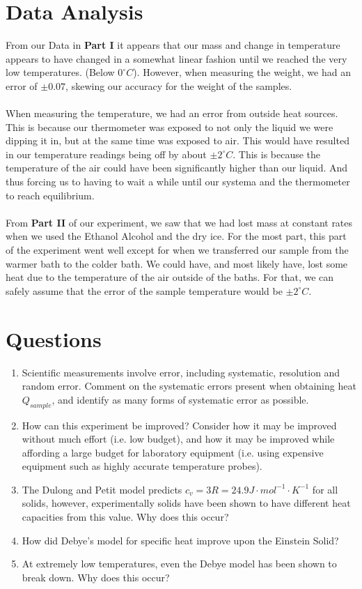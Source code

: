 \documentclass[12pt]{report}
\begin{document}
\section{Data Analysis}
	 From our Data in \textbf{Part I} it appears that our mass and change in temperature appears to have changed in a 
somewhat linear fashion until we reached the very low temperatures. (Below $0^{\circ}C$). However, when measuring the weight, we had an error of $\pm 0.07$, skewing our accuracy for the weight of the samples. \\
	\\When measuring the temperature, we had an error from outside heat sources. This is because our thermometer was exposed to not only the liquid we were dipping it in, but at the same time was exposed to air. This would have resulted in our temperature readings being off by about $\pm 2^{\circ}C$. This is because the temperature of the air could have been significantly higher than our liquid. And thus forcing us to having to wait a while until our systema and the thermometer to reach equilibrium. \\
	\\From \textbf{Part II} of our experiment, we saw that we had lost mass at constant rates when we used the Ethanol Alcohol and the dry ice. For the most part, this part of the experiment went well except for when we transferred our sample from the warmer bath to the colder bath. We could have, and most likely have, lost some heat due to the temperature of the air outside of the baths. For that, we can safely assume that the error of the sample temperature would be $\pm 2^{\circ}C$. \\
\section{Questions}
	\begin{enumerate}
		\item Scientific measurements involve error, including systematic, resolution and
			random error. Comment on the systematic errors present when obtaining
			heat $Q_{sample}$, and identify as many forms of systematic error as possible.
		\item How can this experiment be improved? Consider how it may be improved
			without much effort (i.e. low budget), and how it may be improved while
			affording a large budget for laboratory equipment (i.e. using expensive
			equipment such as highly accurate temperature probes).
		\item The Dulong and Petit model predicts $c_v = 3R = 24.9 J\cdot mol^{-1} \cdot K^{-1}$ for all solids,
			however, experimentally solids have been shown to have different heat
			capacities from this value. Why does this occur?
		\item How did Debye’s model for specific heat improve upon the Einstein Solid?
		\item At extremely low temperatures, even the Debye model has been shown to
			break down. Why does this occur?
	\end{enumerate}
\end{document}

